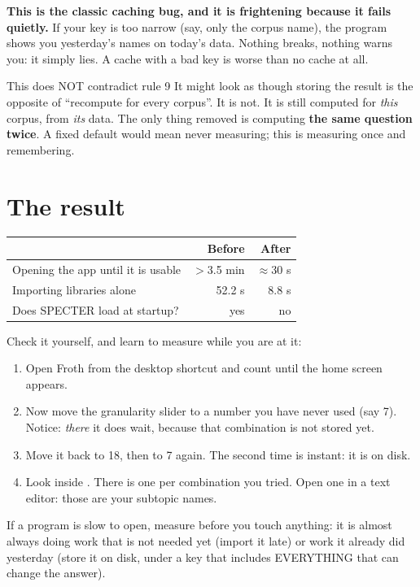 \documentclass[11pt,a4paper]{article}
\begin{document}
\begin{ojo}
\textbf{This is the classic caching bug, and it is frightening because it fails quietly.}
If your key is too narrow (say, only the corpus name), the program shows you yesterday's
names on today's data. Nothing breaks, nothing warns you: it simply lies. A cache with a
bad key is worse than no cache at all.
\end{ojo}

\begin{concepto}{This does NOT contradict rule 9}
It might look as though storing the result is the opposite of ``recompute for every
corpus''. It is not. It is still computed for \emph{this} corpus, from \emph{its} data.
The only thing removed is computing \textbf{the same question twice}. A fixed default
would mean never measuring; this is measuring once and remembering.
\end{concepto}

\section{The result}

\begin{center}
\begin{tabular}{lrr}
\hline
 & \textbf{Before} & \textbf{After} \\
\hline
Opening the app until it is usable & $>$3.5 min & $\approx$30 s \\
Importing libraries alone          & 52.2 s     & 8.8 s \\
Does SPECTER load at startup?      & yes        & no \\
\hline
\end{tabular}
\end{center}

\begin{practica}
Check it yourself, and learn to measure while you are at it:

\begin{enumerate}
  \item Open Froth from the desktop shortcut and count until the home screen appears.
  \item Now move the granularity slider to a number you have never used (say 7). Notice:
        \emph{there} it does wait, because that combination is not stored yet.
  \item Move it back to 18, then to 7 again. The second time is instant: it is on disk.
  \item Look inside . There is one
         per combination you tried. Open one in a text editor:
        those are your subtopic names.
\end{enumerate}
\end{practica}

\begin{resumen}
If a program is slow to open, measure before you touch anything: it is almost always
doing work that is not needed yet (import it late) or work it already did yesterday
(store it on disk, under a key that includes EVERYTHING that can change the answer).
\end{resumen}
\clearpage
\end{document}
